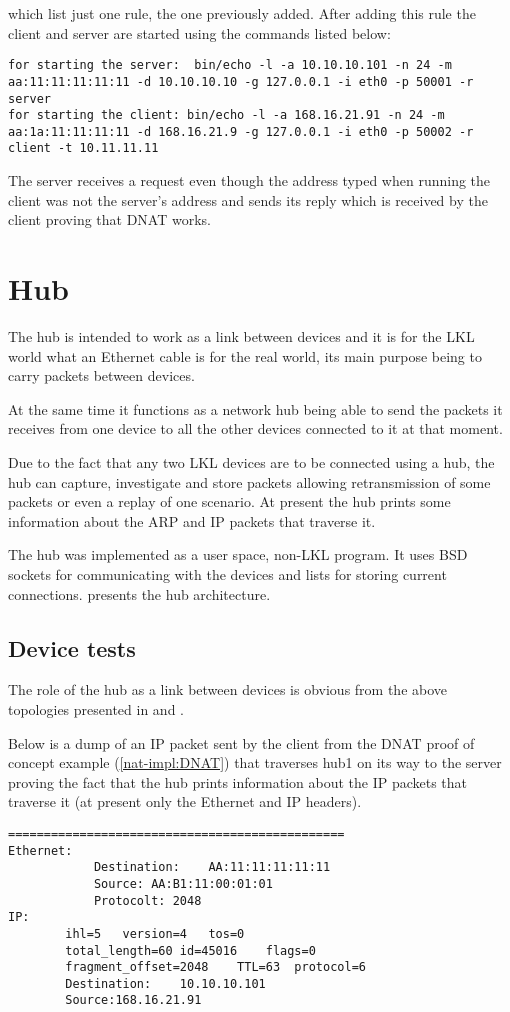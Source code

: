 {{\begin{itemize}
which list just one rule, the one previously added. 
After adding this rule the client and server are started using the commands listed below:
\lstset{language=TeX, caption=SNAT-starting client and server applications}
\begin{lstlisting}
for starting the server:  bin/echo -l -a 10.10.10.101 -n 24 -m aa:11:11:11:11:11 -d 10.10.10.10 -g 127.0.0.1 -i eth0 -p 50001 -r server
for starting the client: bin/echo -l -a 168.16.21.91 -n 24 -m aa:1a:11:11:11:11 -d 168.16.21.9 -g 127.0.0.1 -i eth0 -p 50002 -r client -t 10.11.11.11
\end{lstlisting}
 The server receives a request even though the address typed when running the client was not the server's address and sends its reply which is received by the client proving that DNAT works.
\end{itemize}
\section{Hub}
\label{sec:hub:impl}

The hub is intended to work as a link between devices and it is for the LKL world what an Ethernet 
cable is for the real world, its main purpose being to carry packets between devices.

At the same time it functions as a network hub being able to send the packets it receives from one 
device to all the other devices connected to it at that moment.

Due to the fact that any two LKL devices are to be connected using a hub, the hub can capture, 
investigate and store packets allowing retransmission of some packets or even a replay of one scenario. 
At present the hub prints some information about the ARP and IP packets that traverse it. 

The hub was implemented as a user space, non-LKL program. It uses BSD sockets for communicating with the 
devices and lists for storing current connections.
 presents the hub architecture. 
\subsection{Device tests}
\label{sub-sec:router-tests}
The role of the hub as a link between devices is obvious from the above topologies presented in 
 and .

Below is a dump of an IP packet sent by the client from the DNAT proof of concept example
(\ref{nat-impl:DNAT}) that traverses hub1 on its way to the server proving the fact that 
the hub prints information about the IP packets that traverse it (at present only the Ethernet and IP headers).
\lstset{language=TeX, caption=Hub-print packet information}
\begin{lstlisting}
===============================================
Ethernet:
			Destination:	AA:11:11:11:11:11
			Source:	AA:B1:11:00:01:01
			Protocolt: 2048
IP:
		ihl=5	version=4	tos=0
		total_length=60	id=45016	flags=0
		fragment_offset=2048	TTL=63	protocol=6
		Destination:	10.10.10.101
		Source:168.16.21.91


\end{lstlisting}}}
